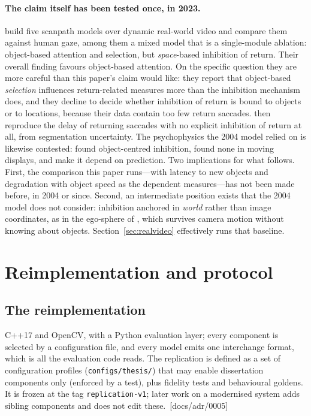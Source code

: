 \documentclass[11pt,a4paper]{article}
\newcommand{\src}[1]{\textcolor{blue!50!black}{\footnotesize\,[#1]}}
\newcommand{\src}[1]{}
\begin{document}
\paragraph{The claim itself has been tested once, in 2023.} \citet{roth2023}
build five scanpath models over dynamic real-world video and compare them
against human gaze, among them a mixed model that is a single-module ablation:
object-based attention and selection, but \emph{space}-based inhibition of
return. Their overall finding favours object-based attention. On the specific
question they are more careful than this paper's claim would like: they report
that object-based \emph{selection} influences return-related measures more than
the inhibition mechanism does, and they decline to decide whether inhibition of
return is bound to objects or to locations, because their data contain too few
return saccades. \citet{mengers2025} then reproduce the delay of returning
saccades with no explicit inhibition of return at all, from segmentation
uncertainty. The psychophysics the 2004 model relied on is likewise contested:
\citet{tipper1991} found object-centred inhibition, \citet{mueller1996} found
none in moving displays, and \citet{krueger2013} make it depend on prediction.
Two implications for what follows. First, the comparison this paper runs---with
latency to new objects and degradation with object speed as the dependent
measures---has not been made before, in 2004 or since. Second, an intermediate
position exists that the 2004 model does not consider: inhibition anchored in
\emph{world} rather than image coordinates, as in the ego-sphere of
\citet{ruesch2008}, which survives camera motion without knowing about objects.
Section~\ref{sec:realvideo} effectively runs that baseline.

\section{Reimplementation and protocol}
\label{sec:method}

\subsection{The reimplementation}
C++17 and OpenCV, with a Python evaluation layer; every component is selected by
a configuration file, and every model emits one interchange format, which is all
the evaluation code reads. The replication is defined as a set of configuration
profiles (\texttt{configs/thesis/}) that may enable dissertation components only
(enforced by a test), plus fidelity tests and behavioural goldens. It is frozen
at the tag \texttt{replication-v1}; later work on a modernised system adds
sibling components and does not edit these. \src{docs/adr/0005}
\end{document}
